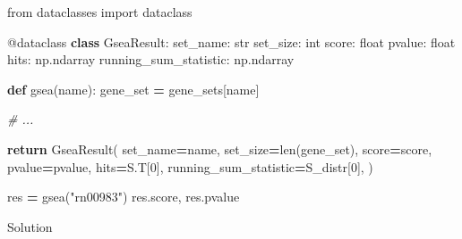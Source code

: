 \documentclass[
]{book}
\newenvironment{Shaded}{\begin{snugshade}}{\end{snugshade}}
\newcommand{\AttributeTok}[1]{\textcolor[rgb]{0.13,0.29,0.53}{#1}}
\newcommand{\BuiltInTok}[1]{#1}
\newcommand{\CommentTok}[1]{\textcolor[rgb]{0.56,0.35,0.01}{\textit{#1}}}
\newcommand{\ControlFlowTok}[1]{\textcolor[rgb]{0.13,0.29,0.53}{\textbf{#1}}}
\newcommand{\DecValTok}[1]{\textcolor[rgb]{0.00,0.00,0.81}{#1}}
\newcommand{\ImportTok}[1]{#1}
\newcommand{\KeywordTok}[1]{\textcolor[rgb]{0.13,0.29,0.53}{\textbf{#1}}}
\newcommand{\NormalTok}[1]{#1}
\newcommand{\OperatorTok}[1]{\textcolor[rgb]{0.81,0.36,0.00}{\textbf{#1}}}
\newcommand{\StringTok}[1]{\textcolor[rgb]{0.31,0.60,0.02}{#1}}
\begin{document}
\begin{Shaded}
\begin{Highlighting}[numbers=left,,]
\ImportTok{from}\NormalTok{ dataclasses }\ImportTok{import}\NormalTok{ dataclass}

\AttributeTok{@dataclass}
\KeywordTok{class}\NormalTok{ GseaResult:}
\NormalTok{    set\_name: }\BuiltInTok{str}
\NormalTok{    set\_size: }\BuiltInTok{int}
\NormalTok{    score: }\BuiltInTok{float}
\NormalTok{    pvalue: }\BuiltInTok{float}
\NormalTok{    hits: np.ndarray}
\NormalTok{    running\_sum\_statistic: np.ndarray}
    
\KeywordTok{def}\NormalTok{ gsea(name):}
\NormalTok{    gene\_set }\OperatorTok{=}\NormalTok{ gene\_sets[name]}
    
    \CommentTok{\# ...}

    \ControlFlowTok{return}\NormalTok{ GseaResult(}
\NormalTok{        set\_name}\OperatorTok{=}\NormalTok{name,}
\NormalTok{        set\_size}\OperatorTok{=}\BuiltInTok{len}\NormalTok{(gene\_set),}
\NormalTok{        score}\OperatorTok{=}\NormalTok{score,}
\NormalTok{        pvalue}\OperatorTok{=}\NormalTok{pvalue,}
\NormalTok{        hits}\OperatorTok{=}\NormalTok{S.T[}\DecValTok{0}\NormalTok{],}
\NormalTok{        running\_sum\_statistic}\OperatorTok{=}\NormalTok{S\_distr[}\DecValTok{0}\NormalTok{],}
\NormalTok{    )}

\NormalTok{res }\OperatorTok{=}\NormalTok{ gsea(}\StringTok{"rn00983"}\NormalTok{)}
\NormalTok{res.score, res.pvalue}
\end{Highlighting}
\end{Shaded}

Solution
\end{document}
